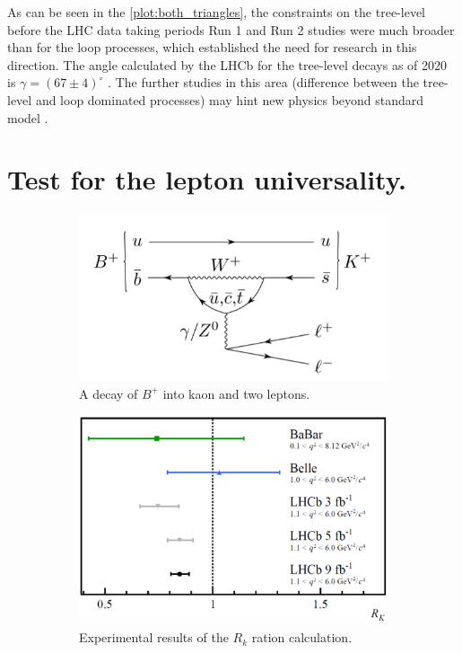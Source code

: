 As can be seen in the \ref{plot:both_triangles}, the constraints on the tree-level before the LHC data taking periods \cite{thelhcbcollaboration2010roadmap} Run 1 and Run 2 studies were much broader than for the loop processes, which established the need for research in this direction.
The angle calculated by the LHCb for the tree-level decays as of 2020 is $γ = (67 \pm 4)^{\circ}$ \cite{LHCb-CONF-2020-003}.
The further studies in this area (difference between the tree-level and loop dominated processes) may hint new physics beyond standard model \cite{Krupa:2314451}.


\section{Test for the lepton universality.}
\label{sec:lepton-uni}

\begin{figure}
\begin{subfigure}[t]{0.5\textwidth}
  \centering
  \includegraphics[width=\linewidth]{figures/chapter1/BKLL.png}
  \caption{A decay of $B^{+}$ into kaon and two leptons.}
\end{subfigure}
\begin{subfigure}[t]{0.5\textwidth}
  \centering
  \includegraphics[width=\linewidth]{figures/chapter1/RK2021_s.png}
  \caption{Experimental results of the $R_{k}$ ration calculation.}
\end{subfigure}
 \caption[Experiments]{}
  \label{fig:bkll}
\end{figure}

